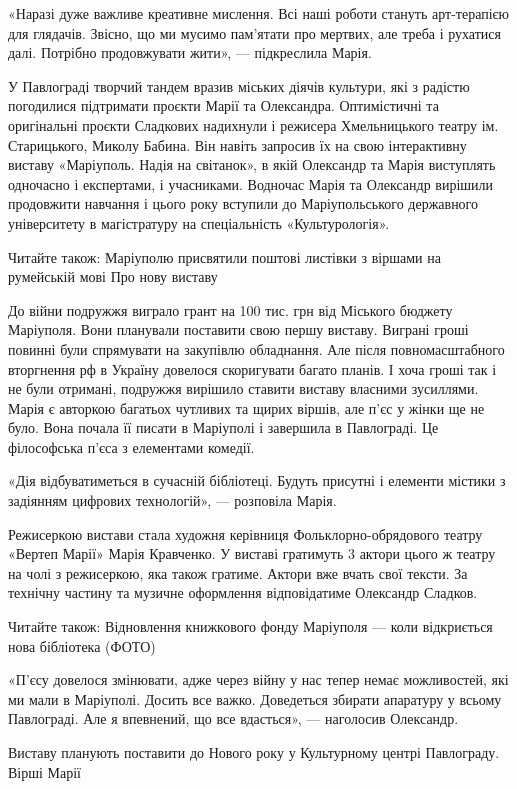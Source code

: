 «Наразі дуже важливе креативне мислення. Всі наші роботи стануть арт-терапією
для глядачів. Звісно, що ми мусимо пам'ятати про мертвих, але треба і рухатися
далі. Потрібно продовжувати жити», — підкреслила Марія. 

У Павлограді творчий тандем вразив міських діячів культури, які з радістю
погодилися підтримати проєкти Марії та Олександра. Оптимістичні та оригінальні
проєкти Сладкових надихнули і режисера Хмельницького театру ім. Старицького,
Миколу Бабина. Він навіть запросив їх на свою інтерактивну виставу «Маріуполь.
Надія на світанок», в якій Олександр та Марія виступлять одночасно і
експертами, і учасниками. Водночас Марія та Олександр вирішили продовжити
навчання і цього року вступили до Маріупольського державного університету в
магістратуру на спеціальність «Культурологія».

Читайте також: Маріуполю присвятили поштові листівки з віршами на румейській
мові Про нову виставу

До війни подружжя виграло грант на 100 тис. грн від Міського бюджету Маріуполя.
Вони планували поставити свою першу виставу. Виграні гроші повинні були
спрямувати на закупівлю обладнання. Але після повномасштабного вторгнення рф в
Україну довелося скоригувати багато планів. І хоча гроші так і не були
отримані, подружжя вирішило ставити виставу власними зусиллями. Марія є
авторкою багатьох чутливих та щирих віршів, але п'єс у жінки ще не було. Вона
почала її писати в Маріуполі і завершила в Павлограді. Це філософська п'єса з
елементами комедії. 

«Дія відбуватиметься в сучасній бібліотеці. Будуть присутні і елементи містики
з задіянням цифрових технологій», — розповіла Марія.

Режисеркою вистави стала художня керівниця Фольклорно-обрядового театру «Вертеп
Марії» Марія Кравченко. У виставі гратимуть 3 актори цього ж театру на чолі з
режисеркою, яка також гратиме. Актори вже вчать свої тексти. За технічну
частину та музичне оформлення відповідатиме Олександр Сладков. 

Читайте також: Відновлення книжкового фонду Маріуполя — коли відкриється нова
бібліотека (ФОТО)

«П'єсу довелося змінювати, адже через війну у нас тепер немає можливостей, які
ми мали в Маріуполі. Досить все важко. Доведеться збирати апаратуру у всьому
Павлограді. Але я впевнений, що все вдасться», — наголосив Олександр.

Виставу планують поставити до Нового року у Культурному центрі Павлограду.
Вірші Марії

